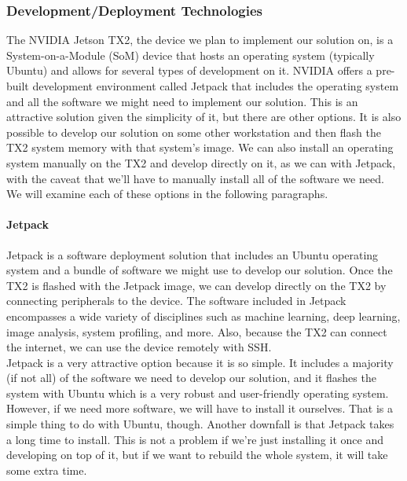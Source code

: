 \subsubsection{Development/Deployment Technologies}
The NVIDIA Jetson TX2, the device we plan to implement our solution on, is a System-on-a-Module (SoM) device that hosts an operating system (typically Ubuntu) and allows for several types of development on it. NVIDIA offers a pre-built development environment called Jetpack that includes the operating system and all the software we might need to implement our solution. This is an attractive solution given the simplicity of it, but there are other options. It is also possible to develop our solution on some other workstation and then flash the TX2 system memory with that system's image. We can also install an operating system manually on the TX2 and develop directly on it, as we can with Jetpack, with the caveat that we'll have to manually install all of the software we need. We will examine each of these options in the following paragraphs.

\paragraph{Jetpack}
Jetpack is a software deployment solution that includes an Ubuntu operating system and a bundle of software we might use to develop our solution. Once the TX2 is flashed with the Jetpack image, we can develop directly on the TX2 by connecting peripherals to the device. The software included in Jetpack encompasses a wide variety of disciplines such as machine learning, deep learning, image analysis, system profiling, and more. Also, because the TX2 can connect the internet, we can use the device remotely with SSH.\\

Jetpack is a very attractive option because it is so simple. It includes a majority (if not all) of the software we need to develop our solution, and it flashes the system with Ubuntu which is a very robust and user-friendly operating system. However, if we need more software, we will have to install it ourselves. That is a simple thing to do with Ubuntu, though. Another downfall is that Jetpack takes a long time to install. This is not a problem if we're just installing it once and developing on top of it, but if we want to rebuild the whole system, it will take some extra time.

